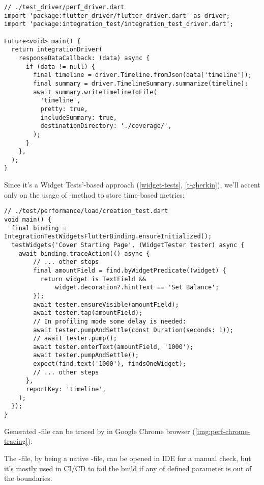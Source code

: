 \begin{lstlisting}
// ./test_driver/perf_driver.dart
import 'package:flutter_driver/flutter_driver.dart' as driver;
import 'package:integration_test/integration_test_driver.dart';

Future<void> main() {
  return integrationDriver(
    responseDataCallback: (data) async {
      if (data != null) {
        final timeline = driver.Timeline.fromJson(data['timeline']);
        final summary = driver.TimelineSummary.summarize(timeline);
        await summary.writeTimelineToFile(
          'timeline',
          pretty: true,
          includeSummary: true,
          destinationDirectory: './coverage/',
        );
      }
    },
  );
}
\end{lstlisting}

\noindent Since it's a Widget Tests'-based approach (\ref{widget-tests}, \ref{t-gherkin}), we'll accent only on the 
usage of -method to store time-based metrics:

\begin{lstlisting}
// ./test/performance/load/creation_test.dart
void main() {
  final binding = IntegrationTestWidgetsFlutterBinding.ensureInitialized();
  testWidgets('Cover Starting Page', (WidgetTester tester) async {
    await binding.traceAction(() async {
        // ... other steps
        final amountField = find.byWidgetPredicate((widget) {
          return widget is TextField && 
              widget.decoration?.hintText == 'Set Balance';
        });
        await tester.ensureVisible(amountField);
        await tester.tap(amountField);
        // In profiling mode some delay is needed:
        await tester.pumpAndSettle(const Duration(seconds: 1));
        // await tester.pump();
        await tester.enterText(amountField, '1000');
        await tester.pumpAndSettle();
        expect(find.text('1000'), findsOneWidget);
        // ... other steps
      },
      reportKey: 'timeline',
    );
  });
}
\end{lstlisting}

\noindent Generated -file can be traced by  in Google Chrome browser 
(\cref{img:perf-chrome-tracing}):


\noindent The -file, by being a native -file, can be opened in IDE for a 
manual check, but it's mostly used in CI/CD to fail the build if any of defined parameter is out of the boundaries. 

